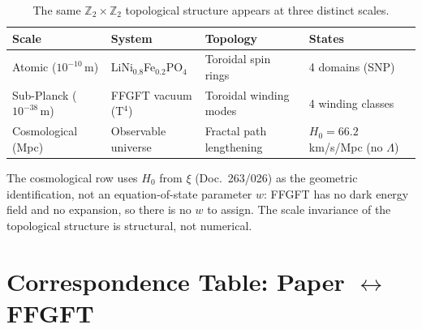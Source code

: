 \begin{table}[htbp]
\centering
\caption{The same $\mathbb{Z}_2\times\mathbb{Z}_2$ topological structure
appears at three distinct scales.}
\label{tab:scales}
\begin{tabular}{llll}
\toprule
\textbf{Scale} & \textbf{System} & \textbf{Topology} & \textbf{States} \\
\midrule
Atomic ($10^{-10}$\,m) &
  LiNi$_{0.8}$Fe$_{0.2}$PO$_4$ &
  Toroidal spin rings &
  4 domains (SNP) \\
Sub-Planck ($10^{-38}$\,m) &
  FFGFT vacuum (T$^4$) &
  Toroidal winding modes &
  4 winding classes \\
Cosmological (Mpc) &
  Observable universe &
  Fractal path lengthening &
  $H_0 = 66.2$\,km/s/Mpc (no $\Lambda$) \\
\bottomrule
\end{tabular}
\end{table}

\noindent The cosmological row uses $H_0$ from $\xi$ (Doc.~263/026) as the
geometric identification, not an equation-of-state parameter $w$: FFGFT has
no dark energy field and no expansion, so there is no $w$ to assign. The
scale invariance of the topological structure is structural, not numerical.

\section{Correspondence Table: Paper $\leftrightarrow$ FFGFT}

